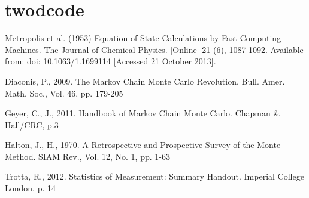 \documentclass[a4paper,11pt,twoside]{article}
\begin{document}
\section{twodcode}
\label{sec:twodcode}

\begin{thebibliography}{10}


		Metropolis et al. (1953) Equation of State Calculations by Fast
		Computing Machines. The Journal of Chemical Physics.
		[Online] 21 (6), 1087-1092. Available from: doi:
		10.1063/1.1699114 [Accessed 21 October 2013].

		Diaconis, P., 2009. The Markov Chain Monte Carlo Revolution.
		Bull. Amer. Math. Soc., Vol. 46, pp. 179-205

		Geyer, C., J., 2011. Handbook of Markov Chain Monte Carlo.
		Chapman \& Hall/CRC, p.3
		
		Halton, J., H., 1970. A Retrospective and Prospective Survey of
		the Monte Method. SIAM Rev., Vol. 12, No. 1, pp. 1-63
	
		Trotta, R., 2012. Statistics of Measurement: Summary Handout.
		Imperial College London, p. 14

\end{thebibliography}
\end{document}
